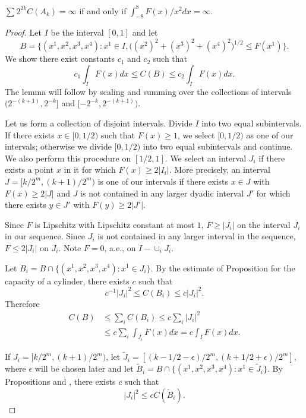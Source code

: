 \begin{lemma}\label{lem:ch5_5.7}
$\sum 2^{2k}C(A_k) = \infty$ if and only if $\int_{-8}^8 F(x)/x^2dx = \infty$.
\end{lemma}

\begin{proof}
Let $I$ be the interval $[0,1]$ and let
\[
    B = \big\{(x^1,x^2,x^3,x^4) : x^1 \in I, \big((x^2)^2 + (x^3)^2 + (x^4)^2\big)^{1/2} \leq F(x^1)\big\}.
\]
We show there exist constants $c_1$ and $c_2$ such that
\begin{equation}\label{eq:ch5_5.11}
c_1 \int_I F(x)dx \leq C(B) \leq c_2 \int_I F(x)dx.
\end{equation}
The lemma will follow by scaling and summing over the collections of intervals $(2^{-(k+1)},2^{-k}]$ and $[-2^{-k},2^{-(k+1)})$.

Let us form a collection of disjoint intervals. Divide $I$ into two equal subintervals. If there exists $x \in [0,1/2)$ such that $F(x) \geq 1$, we select $[0,1/2)$ as one of our intervals; otherwise we divide $[0,1/2)$ into two equal subintervals and continue. We also perform this procedure on $[1/2,1]$. We select an interval $J_i$ if there exists a point $x$ in it for which $F(x) \geq 2|I_i|$. More precisely, an interval $J=[k/2^m,(k+1)/2^m)$ is one of our intervals if there exists $x\in J$ with $F(x)\ge 2|J|$ and $J$ is not contained in any larger dyadic interval $J'$ for which there exists $y \in J'$ with $F(y) \geq 2|J'|$.

Since $F$ is Lipschitz with Lipschitz constant at most $1$, $F \geq |J_i|$ on the interval $J_i$ in our sequence. Since $J_i$ is not contained in any larger interval in the sequence, $F \leq 2|J_i|$ on $J_i$. Note $F = 0$, a.e., on $I - \cup_i J_i$.

Let $B_i = B \cap \{(x^1,x^2,x^3,x^4) : x^1 \in J_i\}$. By the estimate of Proposition  for the capacity of a cylinder, there exists $c$ such that
\begin{equation}\label{eq:ch5_5.12}
    c^{-1}|J_i|^2 \leq C(B_i) \leq c|J_i|^2.
\end{equation}
Therefore
\begin{align*}
    C(B) &\leq \sum_i C(B_i) \leq c\sum_i |J_i|^2 \\
    &\leq c\sum_i \int_{J_i} F(x)dx = c \int_I F(x)dx.
\end{align*}

If $J_i = [k/2^m,(k+1)/2^m)$, let $\widetilde{J}_i = [(k-1/2-\epsilon)/2^m,(k+1/2+\epsilon)/2^m]$, where $\epsilon$ will be chosen later and let $\widetilde{B}_i = B \cap \{(x^1,x^2,x^3,x^4): x^1 \in \widetilde{J}_i\}$. By Propositions  and , there exists $c$ such that
\begin{equation}\label{eq:ch5_5.13}
    |J_i|^2 \leq cC(\widetilde{B}_i).
\end{equation}


\end{proof}

